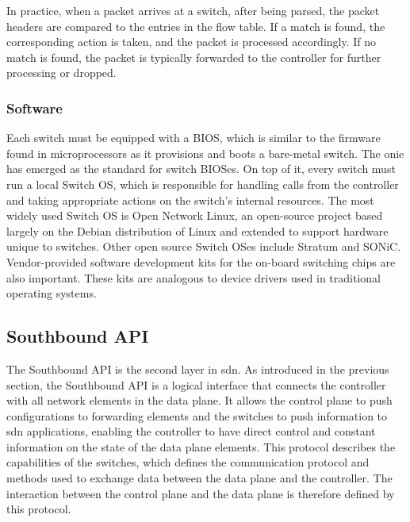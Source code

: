 In practice, when a packet arrives at a switch, after being parsed, the packet headers are compared to the entries in the flow table. If a match is found, the corresponding action is taken, and the packet is processed accordingly. If no match is found, the packet is typically forwarded to the controller for further processing or dropped.

\subsubsection{Software}

Each switch must be equipped with a BIOS, which is similar to the firmware found in microprocessors as it provisions and boots a bare-metal switch. The \gls{onie} has emerged as the standard for switch BIOSes\cite{peterson_software-defined_2021}. On top of it, every switch must run a local Switch OS, which is responsible for handling calls from the controller and taking appropriate actions on the switch's internal resources. The most widely used Switch OS is Open Network Linux\cite{noauthor_linux_nodate}, an open-source project based largely on the Debian distribution of Linux and extended to support hardware unique to switches\cite{peterson_software-defined_2021}. Other open source Switch OSes include Stratum\cite{noauthor_stratum_nodate} and SONiC\cite{noauthor_sonic_nodate}. Vendor-provided software development kits for the on-board switching chips are also important. These kits are analogous to device drivers used in traditional operating systems. 


\subsection{Southbound API} %

The Southbound API is the second layer in \gls{sdn}. As introduced in the previous section, the Southbound API is a logical interface that connects the controller with all network elements in the data plane\cite{thyagaturu_software_2016}. It allows the control plane to push configurations to forwarding elements and the switches to push information to \gls{sdn} applications, enabling the controller to have direct control and constant information on the state of the data plane elements. 
This protocol describes the capabilities of the switches, which defines the communication protocol and methods used to exchange data between the data plane and the controller. The interaction between the control plane and the data plane is therefore defined by this protocol\cite{kreutz_software-defined_2015}. 

